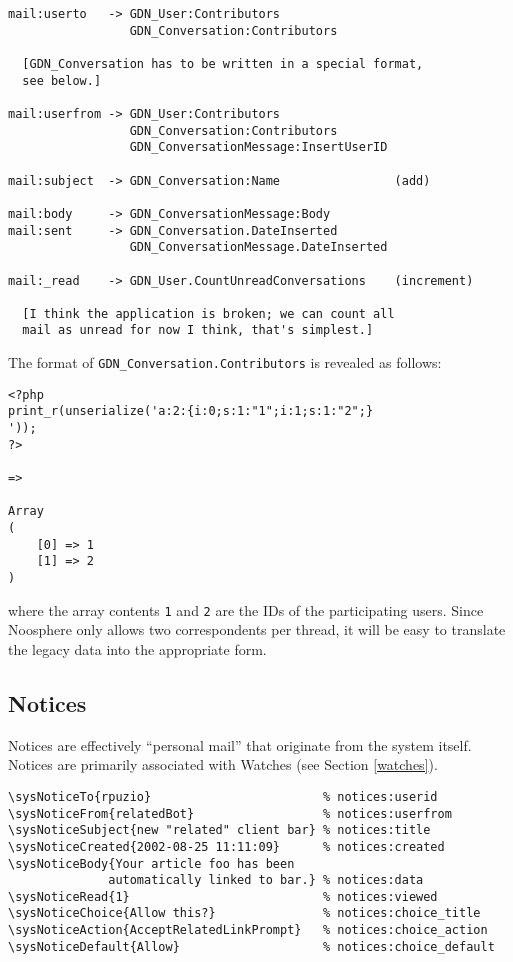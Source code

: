\documentclass{article}
\begin{document}
\begin{verbatim}
mail:userto   -> GDN_User:Contributors
                 GDN_Conversation:Contributors

  [GDN_Conversation has to be written in a special format,
  see below.]

mail:userfrom -> GDN_User:Contributors
                 GDN_Conversation:Contributors
                 GDN_ConversationMessage:InsertUserID

mail:subject  -> GDN_Conversation:Name                (add)

mail:body     -> GDN_ConversationMessage:Body
mail:sent     -> GDN_Conversation.DateInserted
                 GDN_ConversationMessage.DateInserted

mail:_read    -> GDN_User.CountUnreadConversations    (increment)

  [I think the application is broken; we can count all
  mail as unread for now I think, that's simplest.]
\end{verbatim}

The format of \verb|GDN_Conversation.Contributors| is
revealed as follows:

\begin{verbatim}
<?php
print_r(unserialize('a:2:{i:0;s:1:"1";i:1;s:1:"2";}
'));
?>

=>

Array
(
    [0] => 1
    [1] => 2
)
\end{verbatim}

where the array contents {\tt 1} and {\tt 2} are the IDs
of the participating users.  Since Noosphere only allows
two correspondents per thread, it will be easy to
translate the legacy data into the appropriate form.

\subsection{Notices}

Notices are effectively ``personal mail'' that originate
from the system itself.  Notices are primarily associated
with Watches (see Section \ref{watches}).

\begin{verbatim}
\sysNoticeTo{rpuzio}                        % notices:userid
\sysNoticeFrom{relatedBot}                  % notices:userfrom
\sysNoticeSubject{new "related" client bar} % notices:title
\sysNoticeCreated{2002-08-25 11:11:09}      % notices:created
\sysNoticeBody{Your article foo has been
              automatically linked to bar.} % notices:data
\sysNoticeRead{1}                           % notices:viewed
\sysNoticeChoice{Allow this?}               % notices:choice_title
\sysNoticeAction{AcceptRelatedLinkPrompt}   % notices:choice_action
\sysNoticeDefault{Allow}                    % notices:choice_default
\end{verbatim}
\end{document}
